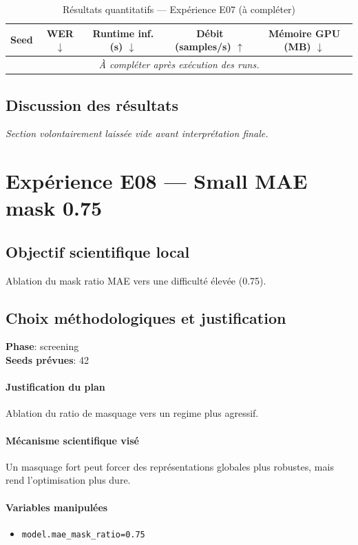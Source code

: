 \documentclass[11pt,a4paper]{article}
\begin{document}
\begin{table}[H]
\centering
\caption{Résultats quantitatifs --- Expérience E07 (à compléter)}
\begin{tabular}{lcccc}
\toprule
Seed & WER $\downarrow$ & Runtime inf. (s) $\downarrow$ & Débit (samples/s) $\uparrow$ & Mémoire GPU (MB) $\downarrow$ \\
\midrule
\multicolumn{5}{c}{\textit{À compléter après exécution des runs.}} \\
\bottomrule
\end{tabular}
\end{table}

\subsection{Discussion des résultats}
\textit{Section volontairement laissée vide avant interprétation finale.}


\section{Expérience E08 --- Small MAE mask 0.75}
\subsection{Objectif scientifique local}
Ablation du mask ratio MAE vers une difficulté élevée (0.75).

\subsection{Choix méthodologiques et justification}
\textbf{Phase}: screening\\
\textbf{Seeds prévues}: 42\\


\paragraph{Justification du plan}
Ablation du ratio de masquage vers un regime plus agressif.

\paragraph{Mécanisme scientifique visé}
Un masquage fort peut forcer des représentations globales plus robustes, mais rend l'optimisation plus dure.

\paragraph{Variables manipulées}
\begin{itemize}
\item \texttt{model.mae\_mask\_ratio=0.75}
\end{itemize}
\end{document}
